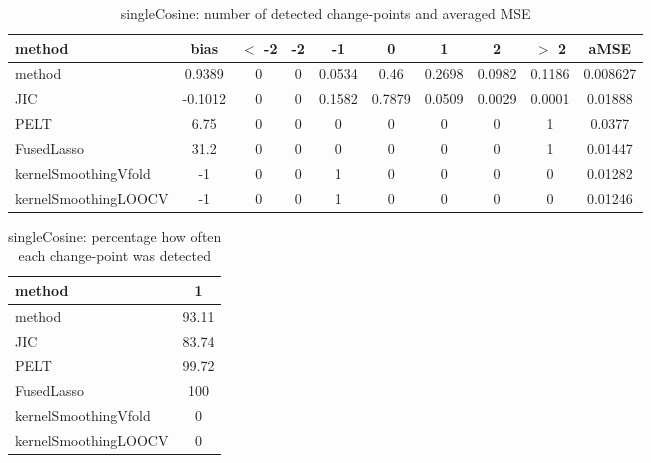 \begin{table}[ht]
\centering
\begin{tabular}{l|c|ccccccc|c}
  \hline
method & bias & $<$ -2 & -2 & -1 & 0 & 1 & 2 & $>$ 2 & aMSE \\ 
  \hline
method & 0.9389 &     0 &     0 & 0.0534 &  0.46 & 0.2698 & 0.0982 & 0.1186 & 0.008627 \\ 
  JIC & -0.1012 &     0 &     0 & 0.1582 & 0.7879 & 0.0509 & 0.0029 & 0.0001 & 0.01888 \\ 
  PELT &  6.75 &     0 &     0 &     0 &     0 &     0 &     0 &     1 & 0.0377 \\ 
  FusedLasso &  31.2 &     0 &     0 &     0 &     0 &     0 &     0 &     1 & 0.01447 \\ 
  kernelSmoothingVfold &    -1 &     0 &     0 &     1 &     0 &     0 &     0 &     0 & 0.01282 \\ 
  kernelSmoothingLOOCV &    -1 &     0 &     0 &     1 &     0 &     0 &     0 &     0 & 0.01246 \\ 
   \hline
\end{tabular}
\caption{singleCosine: number of detected change-points and averaged MSE} 
\label{tab:singleCosineNjumps}
\end{table}
\begin{table}[ht]
\centering
\begin{tabular}{l|c}
  \hline
method & 1 \\ 
  \hline
method &  93.11 \\ 
  JIC &  83.74 \\ 
  PELT &  99.72 \\ 
  FusedLasso &    100 \\ 
  kernelSmoothingVfold &      0 \\ 
  kernelSmoothingLOOCV &      0 \\ 
   \hline
\end{tabular}
\caption{singleCosine: percentage how often each change-point was detected} 
\label{tab:singleCosineDetections}
\end{table}

